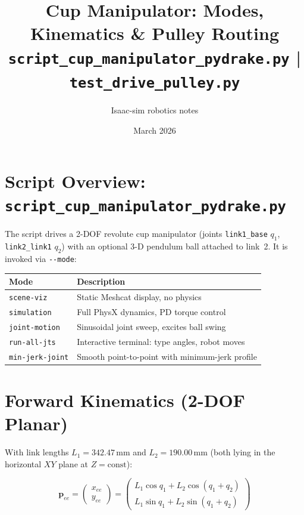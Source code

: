 \documentclass[11pt, a4paper]{article}
\title{\textbf{Cup Manipulator: Modes, Kinematics \& Pulley Routing}\\
       \large \texttt{script\_cup\_manipulator\_pydrake.py} \;|\; \texttt{test\_drive\_pulley.py}}
\date{March 2026}
\author{Isaac-sim robotics notes}
\newcommand{\bp}{\bm{p}}
\begin{document}
\maketitle

\section{Script Overview: \texttt{script\_cup\_manipulator\_pydrake.py}}

The script drives a 2-DOF revolute cup manipulator (joints
\texttt{link1\_base} $q_1$, \texttt{link2\_link1} $q_2$) with an optional
3-D pendulum ball attached to link~2.  It is invoked via \verb|--mode|:

\begin{center}
\begin{tabular}{ll}
\toprule
\textbf{Mode} & \textbf{Description} \\
\midrule
\texttt{scene-viz}    & Static Meshcat display, no physics \\
\texttt{simulation}   & Full PhysX dynamics, PD torque control \\
\texttt{joint-motion} & Sinusoidal joint sweep, excites ball swing \\
\texttt{run-all-jts}  & Interactive terminal: type angles, robot moves \\
\texttt{min-jerk-joint} & Smooth point-to-point with minimum-jerk profile \\
\bottomrule
\end{tabular}
\end{center}

\section{Forward Kinematics (2-DOF Planar)}

With link lengths $L_1 = 342.47\,\text{mm}$ and $L_2 = 190.00\,\text{mm}$
(both lying in the horizontal $XY$ plane at $Z = \text{const}$):

\begin{equation}
  \bp_{ee} =
  \begin{pmatrix} x_{ee} \\ y_{ee} \end{pmatrix}
  =
  \begin{pmatrix}
    L_1 \cos q_1 + L_2 \cos(q_1 + q_2) \\
    L_1 \sin q_1 + L_2 \sin(q_1 + q_2)
  \end{pmatrix}
  \label{eq:fk}
\end{equation}
\end{document}

